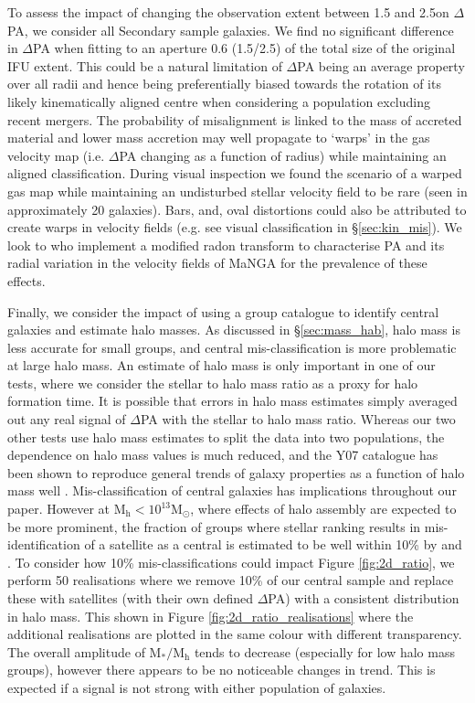 To assess the impact of changing the observation extent between 1.5 and 2.5\re on $\Delta$PA, we consider all Secondary sample galaxies. We find no significant difference in $\Delta$PA when fitting to an aperture 0.6 (1.5/2.5) of the total size of the original IFU extent. This could be a natural limitation of $\Delta$PA being an average property over all radii and hence being preferentially biased towards the rotation of its likely kinematically aligned centre when considering a population excluding recent mergers. The probability of misalignment is linked to the mass of accreted material and lower mass accretion may well propagate to `warps' in the gas velocity map (i.e. $\Delta$PA changing as a function of radius) while maintaining an aligned classification. During visual inspection we found the scenario of a warped gas map while maintaining an undisturbed stellar velocity field to be rare (seen in approximately 20 galaxies). Bars, and, oval distortions could also be attributed to create warps in velocity fields (e.g. see visual classification in \S\ref{sec:kin_mis}). We look to \citet{stark2018} who implement a modified radon transform to characterise PA and its radial variation in the velocity fields of MaNGA for the prevalence of these effects.

Finally, we consider the impact of using a group catalogue to identify central galaxies and estimate halo masses. As discussed in \S\ref{sec:mass_hab}, halo mass is less accurate for small groups, and central mis-classification is more problematic at large halo mass. An estimate of halo mass is only important in one of our tests, where we consider the stellar to halo mass ratio as a proxy for halo formation time. It is possible that errors in halo mass estimates simply averaged out any real signal of $\Delta$PA with the stellar to halo mass ratio. Whereas our two other tests use halo mass estimates to split the data into two populations, the dependence on halo mass values is much reduced, and the Y07 catalogue has been shown to reproduce general trends of galaxy properties as a function of halo mass well \citep{campbell2015}. 
Mis-classification of central galaxies has implications throughout our paper. However at $\mathrm{M_h < 10^{13} M_{\odot}}$, where effects of halo assembly are expected to be more prominent, the fraction of groups where stellar ranking results in mis-identification of a satellite as a central is estimated to be well within 10\% by \cite{campbell2015} and \cite{reddick2013}. To consider how 10\% mis-classifications could impact Figure \ref{fig:2d_ratio}, we perform 50 realisations where we remove 10\% of our central sample and replace these with satellites (with their own defined $\Delta$PA) with a consistent distribution in halo mass. This shown in Figure \ref{fig:2d_ratio_realisations} where the additional realisations are plotted in the same colour with different transparency. The overall amplitude of $\mathrm{M_{\ast}/M_{h}}$ tends to decrease (especially for low halo mass groups), however there appears to be no noticeable changes in trend. This is expected if a signal is not strong with either population of galaxies.

